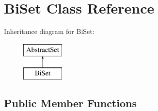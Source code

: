 \hypertarget{classBiSet}{\section{Bi\-Set Class Reference}
\label{classBiSet}
}
Inheritance diagram for Bi\-Set\-:\begin{figure}[H]
\begin{center}
\leavevmode
\includegraphics[height=2.000000cm]{classBiSet}
\end{center}
\end{figure}
\subsection*{Public Member Functions}
